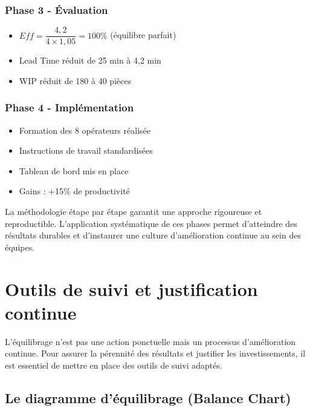 \documentclass[12pt,a4paper]{article}
\newenvironment{importantnote}
  {\begin{tcolorbox}[colback=blue!5!white, colframe=blue!50!black, title=\textbf{Point Important}]\small}
  {\end{tcolorbox}}
\begin{document}
\subsubsection{Phase 3 - Évaluation}
\begin{itemize}
    \item $Eff = \dfrac{4,2}{4 \times 1,05} = 100\%$ (équilibre parfait)
    \item Lead Time réduit de 25 min à 4,2 min
    \item WIP réduit de 180 à 40 pièces
\end{itemize}

\subsubsection{Phase 4 - Implémentation}
\begin{itemize}
    \item Formation des 8 opérateurs réalisée
    \item Instructions de travail standardisées
    \item Tableau de bord mis en place
    \item Gains : +15\% de productivité
\end{itemize}

\begin{importantnote}
La méthodologie étape par étape garantit une approche rigoureuse et reproductible. L'application systématique de ces phases permet d'atteindre des résultats durables et d'instaurer une culture d'amélioration continue au sein des équipes.
\end{importantnote}
\newpage

\section{Outils de suivi et justification continue}

L'équilibrage n'est pas une action ponctuelle mais un processus d'amélioration continue. Pour assurer la pérennité des résultats et justifier les investissements, il est essentiel de mettre en place des outils de suivi adaptés.

\subsection{Le diagramme d'équilibrage (Balance Chart)}
\end{document}

